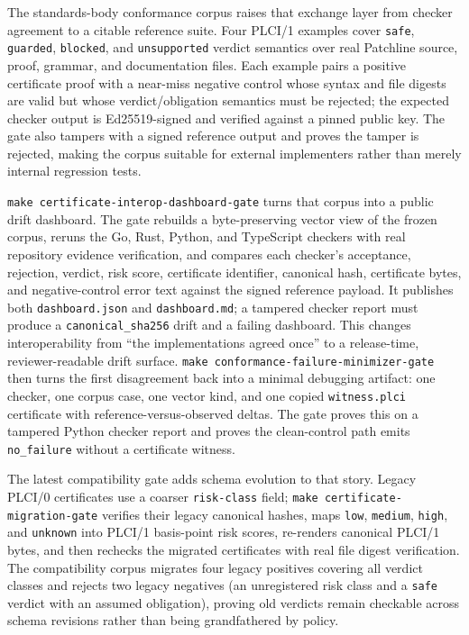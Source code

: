 \documentclass[11pt]{article}
\newcommand{\code}[1]{\texttt{#1}}
\newcommand{\gate}[1]{\texttt{make #1}}
\begin{document}
The standards-body conformance corpus raises that exchange layer from checker agreement to a citable
reference suite. Four PLCI/1 examples cover \code{safe}, \code{guarded}, \code{blocked}, and
\code{unsupported} verdict semantics over real Patchline source, proof, grammar, and documentation
files. Each example pairs a positive certificate proof with a near-miss negative control whose syntax
and file digests are valid but whose verdict/obligation semantics must be rejected; the expected
checker output is Ed25519-signed and verified against a pinned public key. The gate also tampers with a
signed reference output and proves the tamper is rejected, making the corpus suitable for external
implementers rather than merely internal regression tests.

\gate{certificate-interop-dashboard-gate} turns that corpus into a public drift dashboard. The gate
rebuilds a byte-preserving vector view of the frozen corpus, reruns the Go, Rust, Python, and
TypeScript checkers with real repository evidence verification, and compares each checker's acceptance,
rejection, verdict, risk score, certificate identifier, canonical hash, certificate bytes, and
negative-control error text against the signed reference payload. It publishes both
\code{dashboard.json} and \code{dashboard.md}; a tampered checker report must produce a
\code{canonical\_sha256} drift and a failing dashboard. This changes interoperability from ``the
implementations agreed once'' to a release-time, reviewer-readable drift surface.
\gate{conformance-failure-minimizer-gate} then turns the first disagreement back into a minimal
debugging artifact: one checker, one corpus case, one vector kind, and one copied
\code{witness.plci} certificate with reference-versus-observed deltas. The gate proves this on a
tampered Python checker report and proves the clean-control path emits \code{no\_failure} without a
certificate witness.

The latest compatibility gate adds schema evolution to that story. Legacy PLCI/0 certificates use a
coarser \code{risk-class} field; \gate{certificate-migration-gate} verifies their legacy canonical
hashes, maps \code{low}, \code{medium}, \code{high}, and \code{unknown} into PLCI/1 basis-point risk
scores, re-renders canonical PLCI/1 bytes, and then rechecks the migrated certificates with real file
digest verification. The compatibility corpus migrates four legacy positives covering all verdict
classes and rejects two legacy negatives (an unregistered risk class and a \code{safe} verdict with an
assumed obligation), proving old verdicts remain checkable across schema revisions rather than being
grandfathered by policy.
\end{document}
